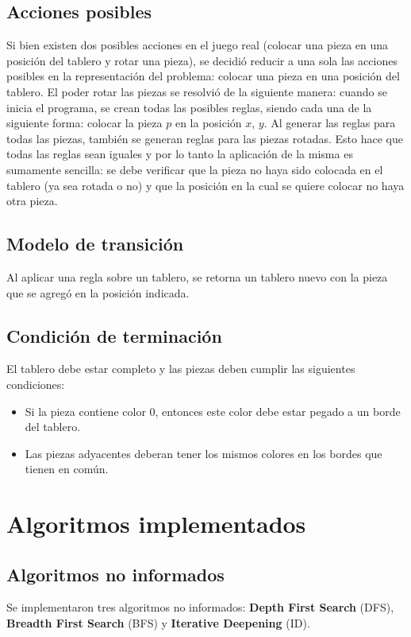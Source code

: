 \documentclass[11pt,twocolumn]{article}
\begin{document}
    \subsection{Acciones posibles}
    \par Si bien existen dos posibles acciones en el juego real (colocar una pieza en una posición del tablero y rotar una pieza), se decidió reducir a una sola las acciones posibles en la representación del problema: colocar una pieza en una posición del tablero. El poder rotar las piezas se resolvió de la siguiente manera: cuando se inicia el programa, se crean todas las posibles reglas, siendo cada una de la siguiente forma: colocar la pieza $p$ en la posición $x$, $y$. Al generar las reglas para todas las piezas, también se generan reglas para las piezas rotadas. Esto hace que todas las reglas sean iguales y por lo tanto la aplicación de la misma es sumamente sencilla: se debe verificar que la pieza no haya sido colocada en el tablero (ya sea rotada o no) y que la posición en la cual se quiere colocar no haya otra pieza.
    \subsection{Modelo de transición}
    \par Al aplicar una regla sobre un tablero, se retorna un tablero nuevo con la pieza que se agregó en la posición indicada.
    \subsection{Condición de terminación}
    \par El tablero debe estar completo y las piezas deben cumplir las siguientes condiciones:
        \begin{itemize}
        \item Si la pieza contiene color $0$, entonces este color debe estar pegado a un borde del tablero.
        \item Las piezas adyacentes deberan tener los mismos colores en los bordes que tienen en común.
        \end{itemize}

\section{Algoritmos implementados}
    \subsection{Algoritmos no informados}
    \par Se implementaron tres algoritmos no informados: \textbf{Depth First Search} (DFS), \textbf{Breadth First Search} (BFS) y \textbf{Iterative Deepening} (ID).
\end{document}
